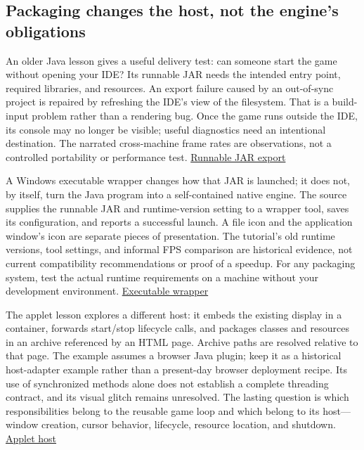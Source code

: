 \subsection{Packaging changes the host, not the engine's obligations}\label{05-engine-i-ch013-packaging-changes-the-host-not-the-engines-obligations}

An older Java lesson gives a useful delivery test: can someone start the game without opening your IDE? Its runnable JAR needs the intended entry point, required libraries, and resources. An export failure caused by an out-of-sync project is repaired by refreshing the IDE's view of the filesystem. That is a build-input problem rather than a rendering bug. Once the game runs outside the IDE, its console may no longer be visible; useful diagnostics need an intentional destination. The narrated cross-machine frame rates are observations, not a controlled portability or performance test. \href{https://www.youtube.com/watch?v=velhSXA2CnQ}{Runnable JAR export}

A Windows executable wrapper changes how that JAR is launched; it does not, by itself, turn the Java program into a self-contained native engine. The source supplies the runnable JAR and runtime-version setting to a wrapper tool, saves its configuration, and reports a successful launch. A file icon and the application window's icon are separate pieces of presentation. The tutorial's old runtime versions, tool settings, and informal FPS comparison are historical evidence, not current compatibility recommendations or proof of a speedup. For any packaging system, test the actual runtime requirements on a machine without your development environment. \href{https://www.youtube.com/watch?v=ucW3mBoTyTw}{Executable wrapper}

The applet lesson explores a different host: it embeds the existing display in a container, forwards start/stop lifecycle calls, and packages classes and resources in an archive referenced by an HTML page. Archive paths are resolved relative to that page. The example assumes a browser Java plugin; keep it as a historical host-adapter example rather than a present-day browser deployment recipe. Its use of synchronized methods alone does not establish a complete threading contract, and its visual glitch remains unresolved. The lasting question is which responsibilities belong to the reusable game loop and which belong to its host---window creation, cursor behavior, lifecycle, resource location, and shutdown. \href{https://www.youtube.com/watch?v=WkBMoCbbgO0}{Applet host}

